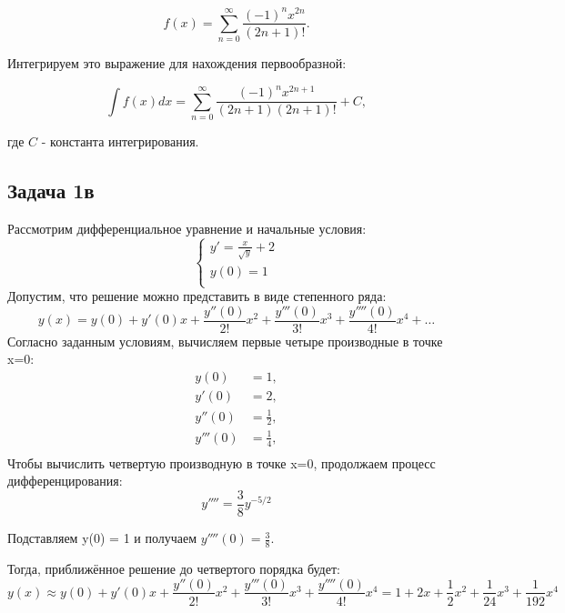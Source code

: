 \documentclass{article}
\begin{document}
\begin{equation}
f(x) = \sum_{n=0}^{\infty} \frac{(-1)^n x^{2n}}{(2n+1)!}.
\end{equation}

Интегрируем это выражение для нахождения первообразной:

\begin{equation}
\int f(x) dx = \sum_{n=0}^{\infty} \frac{(-1)^n x^{2n+1}}{(2n+1)(2n+1)!} + C,
\end{equation}

где $C$ - константа интегрирования.

\newpage
\subsection{Задача 1в}

Рассмотрим дифференциальное уравнение и начальные условия:
\begin{equation*}
\begin{cases}
   y' = \frac{x}{\sqrt{y}} + 2 \\
   y(0) = 1 \\
\end{cases}
\end{equation*}
Допустим, что решение можно представить в виде степенного ряда:
\begin{equation*}
y(x) = y(0) + y'(0)x + \frac{y''(0)}{2!}x^2 + \frac{y'''(0)}{3!}x^3 + \frac{y''''(0)}{4!}x^4 + \ldots
\end{equation*}
Согласно заданным условиям, вычисляем первые четыре производные в точке x=0:
\begin{align*}
y(0) &= 1, \\
y'(0) &= 2, \\
y''(0) &= \frac{1}{2}, \\
y'''(0) &= \frac{1}{4}, \\
\end{align*}
Чтобы вычислить четвертую производную в точке x=0, продолжаем процесс дифференцирования:
\begin{equation*}
y'''' = \frac{3}{8} y^{-5/2}
\end{equation*}

Подставляем y(0) = 1 и получаем $y''''(0) = 
\frac{3}{8}$.

Тогда, приближённое решение до четвертого порядка будет:
\begin{equation*}
y(x) \approx y(0) + y'(0)x + \frac{y''(0)}{2!}x^2 + \frac{y'''(0)}{3!}x^3 + \frac{y''''(0)}{4!}x^4 = 1 + 2x + \frac{1}{2}x^2 + \frac{1}{24}x^3 + \frac{1}{192}x^4
\end{equation*}
\end{document}
